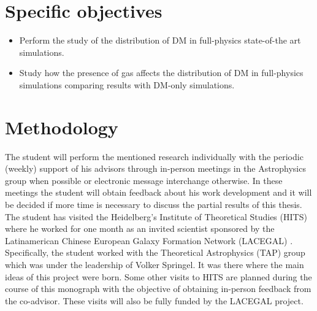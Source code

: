 \documentclass[12pt]{article}
\begin{document}
\section{Specific objectives}


\begin{itemize}
	\item Perform the study of the distribution of DM in full-physics state-of-the art simulations.

	\item Study how the presence of gas affects the distribution of DM in full-physics simulations comparing results with DM-only simulations.
\end{itemize}

\section{Methodology}




The student will perform the mentioned research individually with the periodic (weekly) support of his advisors through in-person meetings in the Astrophysics group when possible or electronic message interchange otherwise. In these meetings the student will obtain feedback about his work development and it will be decided if more time is necessary to discuss the partial results of this thesis. The student has visited  the Heidelberg's Institute of Theoretical Studies (HITS) where he worked for one month as an invited scientist sponsored by the Latinamerican Chinese European Galaxy Formation Network (LACEGAL) \cite{LACEGAL}. Specifically, the student worked with the Theoretical Astrophysics (TAP) group which was under the leadership of Volker Springel. It was there where the main ideas of this project were born. Some other visits to HITS are planned during the course of this monograph with the objective of obtaining in-person feedback from the co-advisor. These visits will also be fully funded by the LACEGAL project.\\
\end{document}
